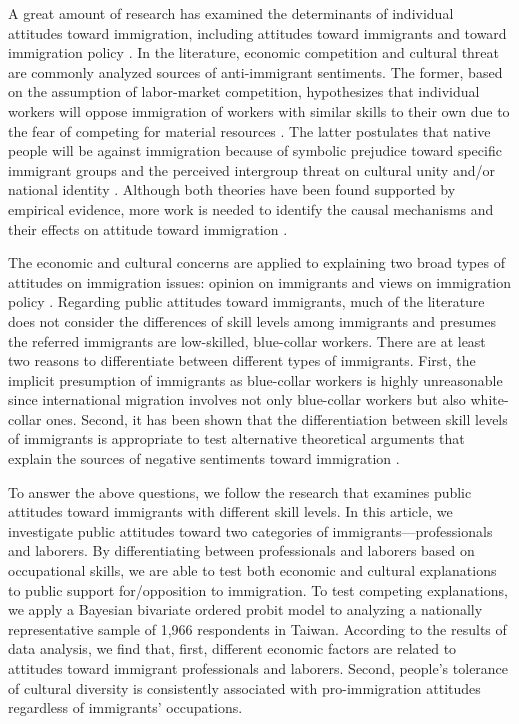 \documentclass[12pt]{article}
\begin{document}
A great amount of research has examined the determinants of individual attitudes toward immigration, including attitudes toward immigrants \citep[e.g.,][]{EspenshadeCalhoun1993, EspenshadeHempstead1996} and toward immigration policy \citep[e.g.,][]{ChandlerTsai2001, Citrinetal1997}. In the literature, economic competition and cultural threat are commonly analyzed sources of anti-immigrant sentiments. The former, based on the assumption of labor-market competition, hypothesizes that individual workers will oppose immigration of workers with similar skills to their own due to the fear of competing for material resources \citep{Mayda2006, ScheveSlaughter2001}. The latter postulates that native people will be against immigration because of symbolic prejudice toward specific immigrant groups \citep{LeeFiske2006} and the perceived intergroup threat on cultural unity and/or national identity \citep{Blumer1958, BurnsGimpel2000, Quillian1995}. Although both theories have been found supported by empirical evidence, more work is needed to identify the causal mechanisms and their effects on attitude toward immigration \citep{CeobanuEscandell2010, HainmuellerHopkins2014}.


The economic and cultural concerns are applied to explaining two broad types of attitudes on immigration issues: opinion on immigrants and views on immigration policy \citep{CeobanuEscandell2010}. Regarding public attitudes toward immigrants, much of the literature does not consider the differences of skill levels among immigrants and presumes the referred immigrants are low-skilled, blue-collar workers. There are at least two reasons to differentiate between different types of immigrants. First, the implicit presumption of immigrants as blue-collar workers is highly unreasonable since international migration involves not only blue-collar workers but also white-collar ones. Second, it has been shown that the differentiation between skill levels of immigrants is appropriate to test alternative theoretical arguments that explain the sources of negative sentiments toward immigration \citep{HainmuellerHiscox2007}. 


To answer the above questions, we follow the research that examines public attitudes toward immigrants with different skill levels. In this article, we investigate public attitudes toward two categories of immigrants---professionals and laborers. By differentiating between professionals and laborers based on occupational skills, we are able to test both economic and cultural explanations to public support for/opposition to immigration. To test competing explanations, we apply a Bayesian bivariate ordered probit model to analyzing a nationally representative sample of 1,966 respondents in Taiwan. According to the results of data analysis, we find that, first, different economic factors are related to attitudes toward immigrant professionals and laborers. Second, people's tolerance of cultural diversity is consistently associated with pro-immigration attitudes regardless of immigrants' occupations.
\end{document}

